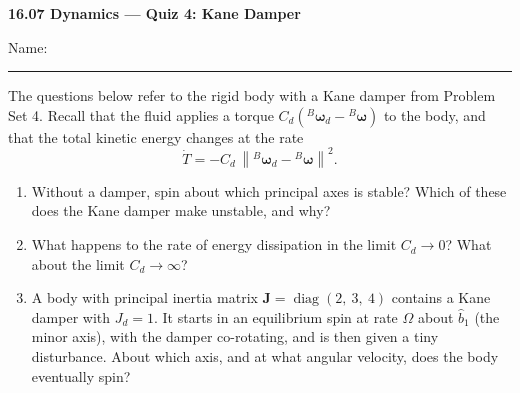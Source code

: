\documentclass[11pt,letterpaper]{article}
\begin{document}
\begin{center}
    {\Large \textbf{16.07 Dynamics --- Quiz 4: Kane Damper}}
\end{center}

\vspace{4pt}

Name: \rule{3.2in}{0.4pt}

\vspace{14pt}
The questions below refer to the rigid body with a Kane damper from Problem Set 4. Recall that the fluid applies a torque $C_d\left({}^{B}\boldsymbol{\omega}_d - {}^{B}\boldsymbol{\omega}\right)$ to the body, and that the total kinetic energy changes at the rate
\[
\dot T = -C_d\,\left\lVert {}^{B}\boldsymbol{\omega}_d - {}^{B}\boldsymbol{\omega} \right\rVert^2 .
\]

\vspace{10pt}
\begin{enumerate}[label=\textbf{\arabic*.}, leftmargin=*, itemsep=4pt, series=quiz]

\item Without a damper, spin about which principal axes is stable? Which of these does the Kane damper make unstable, and why?
\vspace{2in}

\item What happens to the rate of energy dissipation in the limit $C_d \to 0$? What about the limit $C_d \to \infty$?
\vspace{2in}

\item A body with principal inertia matrix $\mathbf{J} = \operatorname{diag}(2,\ 3,\ 4)$ contains a Kane damper with $J_d = 1$. It starts in an equilibrium spin at rate $\Omega$ about $\hat b_1$ (the minor axis), with the damper co-rotating, and is then given a tiny disturbance. About which axis, and at what angular velocity, does the body eventually spin?


\vspace*{\fill}

\end{enumerate}
\end{document}
